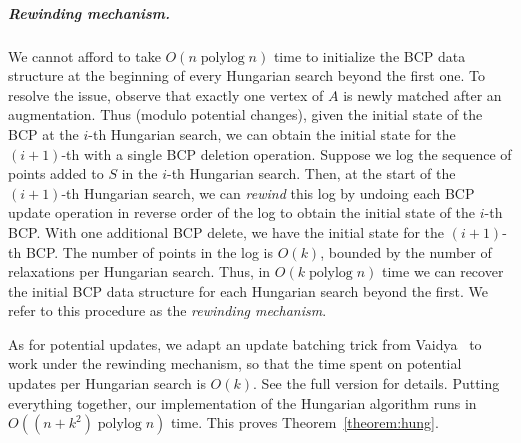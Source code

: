 \documentclass[a4paper,UKenglish]{socg-lipics-v2018}
\def\polylog{\mathop{\mathrm{polylog}}}
\theoremstyle{plain}
\numberwithin{figure}{section}
\renewcommand{\paragraph}{\subparagraph}
\def\EMPH#1{\textcolor{BrickRed}{{\emph{#1}}}}
\begin{document}
\paragraph{Rewinding mechanism.}
We cannot afford to take $O(n\polylog n)$ time to initialize the BCP data structure at the
beginning of every Hungarian search beyond the first one.
To resolve the issue, observe that exactly one vertex of $A$ is newly matched after an augmentation.
Thus (modulo potential changes), given the initial state of the BCP at the $i$-th Hungarian search,
we can obtain the initial state for the $(i+1)$-th with a single BCP deletion operation.
Suppose we log the sequence of points added to $S$ in the $i$-th Hungarian search.
Then, at the start of the $(i+1)$-th Hungarian search, we can \emph{rewind} this
log by undoing each BCP update operation in reverse order of the log to obtain
the initial state of the $i$-th BCP.
With one additional BCP delete, we have the initial state for the $(i+1)$-th BCP.
The number of points in the log is $O(k)$, bounded by the number of relaxations
per Hungarian search.
Thus, in $O(k\polylog n)$ time we can recover the initial BCP data structure
for each Hungarian search beyond the first.
We refer to this procedure as the \EMPH{rewinding mechanism}.

As for potential updates, we adapt an update batching trick from Vaidya~\cite{Vaidya89}
to work under the rewinding mechanism, so that the time spent on potential
updates per Hungarian search is $O(k)$.
See the full version for details.
%
Putting everything together, our implementation of the Hungarian algorithm runs
in $O((n + k^2)\polylog n)$ time.
This proves Theorem~\ref{theorem:hung}.
\end{document}
